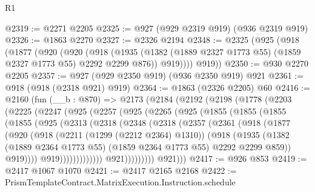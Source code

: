 \begin{lexlean}{R1}
\begin{coremodule}
@2319 := @2271 @2205
@2325 := @927 (@929 @2319 @919) (@936 @2319 @919)
@2326 := @1863 @2270
@2327 := @2326 @2194
@2348 := @2325
    (@925
      (@918
        (@1877
          (@920
            (@920
              (@918
                (@1935 (@1382 (@1889 @2327 @1773 @55) (@1859 @2327 @1773 @55) @2292 @2299 @876))
                @919))))
        @919))
@2350 := @930 @2270 @2205
@2357 := @927 (@929 @2350 @919) (@936 @2350 @919) @921
@2361 := @918 (@918 (@2318 @921) @919)
@2364 := @1863 (@2326 @2205) @60
@2416 := @2160
    (fun (__b : @870) =>
    @2173
      (@2184
        (@2192
          (@2198
            (@1778
              (@2203
                (@2225
                  (@2247
                    (@925
                      (@2257
                        (@925
                          (@2265
                            (@925
                              (@1855
                                (@1855
                                  (@1855
                                    (@1855
                                      (@925
                                        (@2313
                                          (@2318
                                            (@2348
                                              (@2318
                                                (@2357
                                                  (@2361
                                                    (@918
                                                      (@1877
                                                        (@920
                                                          (@918
                                                            (@2211 (@1299 (@2212 @2364) @1310))
                                                            (@918
                                                              (@1935
                                                                (@1382
                                                                  (@1889 @2364 @1773 @55)
                                                                  (@1859 @2364 @1773 @55)
                                                                  @2292
                                                                  @2299
                                                                  @859))
                                                              @919))))
                                                      @919)))))))))))))
                            @921)))))))))
          @921)))
@2417 := @926 @853
@2419 := @2417 @1067 @1070
@2421 := @2417 @2165 @2168
@2422 := PrismTemplateContract.MatrixExecution.Instruction.schedule

\end{coremodule}
\end{lexlean}
